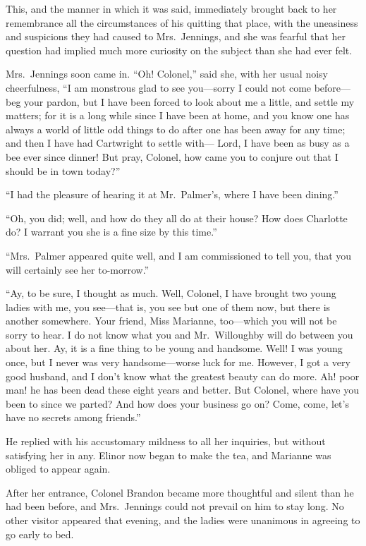 This, and the manner in which it was said,
immediately brought back to her remembrance all the
circumstances of his quitting that place, with the
uneasiness and suspicions they had caused to Mrs.\ Jennings,
and she was fearful that her question had implied
much more curiosity on the subject than she had ever felt.

Mrs.\ Jennings soon came in.  ``Oh! Colonel,'' said she,
with her usual noisy cheerfulness, ``I am monstrous glad
to see you---sorry I could not come before---beg your
pardon, but I have been forced to look about me a little,
and settle my matters; for it is a long while since I
have been at home, and you know one has always a world
of little odd things to do after one has been away for
any time; and then I have had Cartwright to settle with---%
Lord, I have been as busy as a bee ever since dinner!
But pray, Colonel, how came you to conjure out that I should
be in town today?''

``I had the pleasure of hearing it at Mr.\ Palmer's,
where I have been dining.''

``Oh, you did; well, and how do they all do at their
house?  How does Charlotte do?  I warrant you she is a fine
size by this time.''

``Mrs.\ Palmer appeared quite well, and I am commissioned
to tell you, that you will certainly see her to-morrow.''

``Ay, to be sure, I thought as much.  Well, Colonel,
I have brought two young ladies with me, you see---that is,
you see but one of them now, but there is another somewhere.
Your friend, Miss Marianne, too---which you will not be
sorry to hear.  I do not know what you and Mr.\ Willoughby
will do between you about her.  Ay, it is a fine thing
to be young and handsome.  Well! I was young once, but I
never was very handsome---worse luck for me.  However, I got
a very good husband, and I don't know what the greatest
beauty can do more.  Ah! poor man! he has been dead
these eight years and better.  But Colonel, where have
you been to since we parted?  And how does your business
go on?  Come, come, let's have no secrets among friends.''

He replied with his accustomary mildness to all
her inquiries, but without satisfying her in any.
Elinor now began to make the tea, and Marianne was
obliged to appear again.

After her entrance, Colonel Brandon became
more thoughtful and silent than he had been before,
and Mrs.\ Jennings could not prevail on him to stay long.
No other visitor appeared that evening, and the ladies
were unanimous in agreeing to go early to bed.


